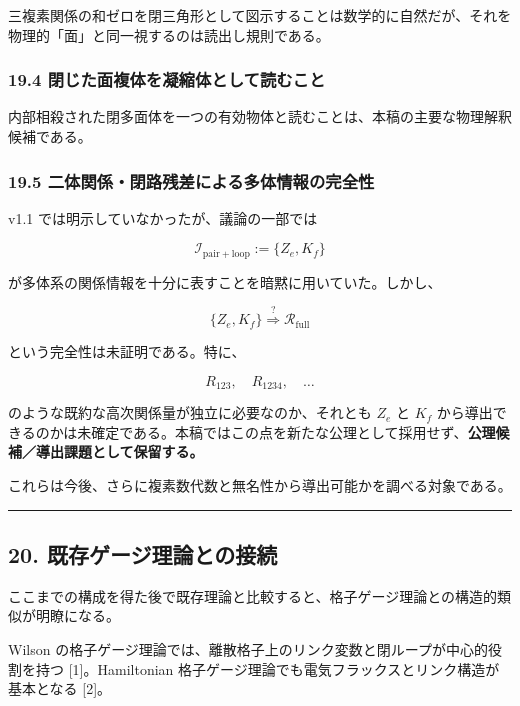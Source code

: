 \documentclass[
  a4paper,
]{ltjsarticle}
\begin{document}
三複素関係の和ゼロを閉三角形として図示することは数学的に自然だが、それを物理的「面」と同一視するのは読出し規則である。

\subsubsection{19.4
閉じた面複体を凝縮体として読むこと}\label{ux9589ux3058ux305fux9762ux8907ux4f53ux3092ux51ddux7e2eux4f53ux3068ux3057ux3066ux8aadux3080ux3053ux3068}

内部相殺された閉多面体を一つの有効物体と読むことは、本稿の主要な物理解釈候補である。

\subsubsection{19.5
二体関係・閉路残差による多体情報の完全性}\label{ux4e8cux4f53ux95a2ux4fc2ux9589ux8defux6b8bux5deeux306bux3088ux308bux591aux4f53ux60c5ux5831ux306eux5b8cux5168ux6027}

v1.1 では明示していなかったが、議論の一部では

\[
\mathcal I_{\mathrm{pair+loop}}:=\{Z_e,K_f\}
\]

が多体系の関係情報を十分に表すことを暗黙に用いていた。しかし、

\[
\boxed{\{Z_e,K_f\}\stackrel{?}{\Longrightarrow}\mathcal R_{\mathrm{full}}}
\]

という完全性は未証明である。特に、

\[
R_{123},\quad R_{1234},\quad\ldots
\]

のような既約な高次関係量が独立に必要なのか、それとも \(Z_e\) と \(K_f\)
から導出できるのかは未確定である。本稿ではこの点を新たな公理として採用せず、\textbf{公理候補／導出課題として保留する。}

これらは今後、さらに複素数代数と無名性から導出可能かを調べる対象である。

\begin{center}\rule{0.5\linewidth}{0.5pt}\end{center}

\subsection{20.
既存ゲージ理論との接続}\label{ux65e2ux5b58ux30b2ux30fcux30b8ux7406ux8ad6ux3068ux306eux63a5ux7d9a}

ここまでの構成を得た後で既存理論と比較すると、格子ゲージ理論との構造的類似が明瞭になる。

Wilson
の格子ゲージ理論では、離散格子上のリンク変数と閉ループが中心的役割を持つ
{[}1{]}。Hamiltonian
格子ゲージ理論でも電気フラックスとリンク構造が基本となる {[}2{]}。
\end{document}
